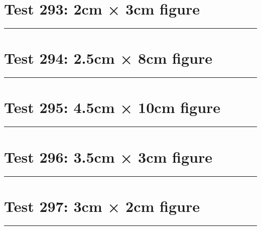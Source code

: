 \documentclass[a4paper,11pt]{article}
\begin{document}
\section*{Test 293: 2cm × 3cm figure}
\begin{swarmwrap}%
  \begin{minipage}[t]{2cm}
    \centering
    \rule{\linewidth}{3cm}
  \end{minipage}%
\end{swarmwrap}%
\swarmwrapnext
\lipsum[139]
\lipsum[140]
\lipsum[141]
\lipsum[142]
\section*{Test 294: 2.5cm × 8cm figure}
\begin{swarmwrap}%
  \begin{minipage}[t]{2cm}
    \centering
    \rule{\linewidth}{8cm}
  \end{minipage}%
\end{swarmwrap}%
\swarmwrapnext
\lipsum[96]
\lipsum[97]
\lipsum[98]
\lipsum[99]
\lipsum[100]
\lipsum[101]
\section*{Test 295: 4.5cm × 10cm figure}
\begin{swarmwrap}%
  \begin{minipage}[t]{4cm}
    \centering
    \rule{\linewidth}{10cm}
  \end{minipage}%
\end{swarmwrap}%
\swarmwrapnext
\lipsum[41]
\lipsum[42]
\lipsum[43]
\lipsum[44]
\lipsum[45]
\lipsum[46]
\section*{Test 296: 3.5cm × 3cm figure}
\begin{swarmwrap}%
  \begin{minipage}[t]{3cm}
    \centering
    \rule{\linewidth}{3cm}
  \end{minipage}%
\end{swarmwrap}%
\swarmwrapnext
\lipsum[106]
\lipsum[107]
\lipsum[108]
\lipsum[109]
\lipsum[110]
\lipsum[111]
\section*{Test 297: 3cm × 2cm figure}
\begin{swarmwrap}%
  \begin{minipage}[t]{3cm}
    \centering
    \rule{\linewidth}{2cm}
  \end{minipage}%
\end{swarmwrap}%
\swarmwrapnext
\lipsum[57]
\lipsum[58]
\lipsum[59]
\lipsum[60]
\lipsum[61]
\end{document}

